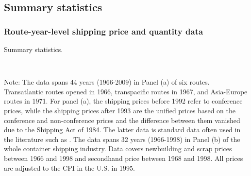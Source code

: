 \documentclass[11pt]{article}
\begin{document}





\subsection{Summary statistics}\label{subsec:summary_statistics}

\subsubsection{Route-year-level shipping price and quantity data}

\begin{table}[!htbp]
  \begin{center}
      \caption{Summary statistics.}
      \label{tb:summary_statistics} 
      \\
  \end{center}\footnotesize
  Note: The data spans 44 years (1966-2009) in Panel (a) of six routes. Transatlantic routes opened in 1966, transpacific routes in 1967, and Asia-Europe routes in 1971. For panel (a), the shipping prices before 1992 refer to conference prices, while the shipping prices after 1993 are the unified prices based on the conference and non-conference prices and the difference between them vanished due to the Shipping Act of 1984. The latter data is standard data often used in the literature such as \cite{jeon2017learning}. The data spans 32 years (1966-1998) in Panel (b) of the whole container shipping industry. Data covers newbuilding and scrap prices between 1966 and 1998 and secondhand price between 1968 and 1998. All prices are adjusted to the CPI in the U.S. in 1995. 
\end{table} 
\end{document}
